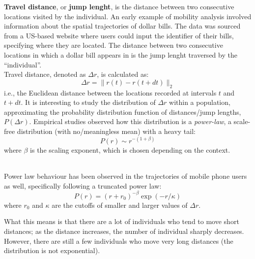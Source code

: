 \textbf{Travel distance}, or \textbf{jump lenght}, is the distance between two consecutive locations visited by the individual. An early example of mobility analysis involved information about the spatial trajectories of dollar bills. The data was sourced from a US-based website where users could input the identifier of their bills, specifying where they are located. The distance between two consecutive locations in which a dollar bill appears in is the jump lenght traversed by the ``individual''. \\
Travel distance, denoted as $\Delta r$, is calculated as:
\begin{equation*}
    \Delta r = \| r(t) - r(t + dt) \|_2
\end{equation*}
i.e., the Euclidean distance between the locations recorded at intervals $t$ and $t + dt$. It is interesting to study the distribution of $\Delta r$ within a population, approximating the probability distribution function of distances/jump lengths, $P(\Delta r)$. Empirical studies observed how this distribution is a \textit{power-law}, a scale-free distribution (with no/meaningless mean) with a heavy tail:
\begin{equation*}
    P(r) \sim r^{-(1+\beta)}
\end{equation*}
where $\beta$ is the scaling exponent, which is chosen depending on the context.
\begin{figure}[h]
    \centering  
    
\end{figure} \\
Power law behaviour has been observed in the trajectories of mobile phone users as well, specifically following a truncated power law:
\begin{equation*}
    P(r) = (r + r_0)^{-\beta} \exp(-r/\kappa)
\end{equation*}
where $r_0$ and $\kappa$ are the cutoffs of smaller and larger values of $\Delta r$.

What this means is that there are a lot of individuals who tend to move short distances; as the distance increases, the number of individual sharply decreases. However, there are still a few individuals who move very long distances (the distribution is not exponential).

